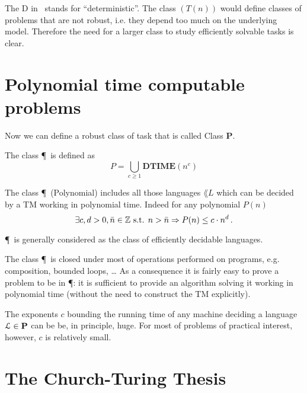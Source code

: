 \begin{remark}
	The D in \DTIME~stands for ``deterministic''.
	The class \DTIME$(T(n))$ would define classes of problems that are not robust, i.e. they depend too much on the underlying model. Therefore the need for a larger class to study efficiently solvable tasks is clear.
\end{remark}

\section{Polynomial time computable problems}

Now we can define a robust class of task that is called Class \textbf{P}.
\begin{definition}
	The class \P~is defined as
	\begin{equation}
		P = \bigcup_{c \geq 1} \textbf{DTIME}(n^c)
		\label{eq:class-P}
	\end{equation}
	\label{def:class-P}
\end{definition}
The class \P~(Polynomial) includes all those languages $\lang{L}$ which can be decided by a TM working in polynomial time.
Indeed for any polynomial $P(n)$
\[
	\exists c,d>0, \bar{n} \in \mathbb{Z} \text{ s.t. } n> \bar{n} \Rightarrow P(n) \le c \cdot n^d \, .
\]
\begin{remark}
	\P~is generally considered as the class of efficiently decidable languages.
\end{remark}
\begin{remark}[Robustness of \P]
	The class \P~is closed under most of operations performed on programs, e.g. composition, bounded loops, \dots
	As a consequence it is fairly easy to prove a problem to be in \P: it is sufficient to provide an algorithm solving it working in polynomial time (without the need to construct the TM explicitly).

	The exponents $c$ bounding the running time of any machine deciding a language $\mathcal{L} \in \textbf{P}$ can be be, in principle, huge. For most of problems of practical interest, however, $c$ is relatively small.
\end{remark}

\section{The Church-Turing Thesis}

